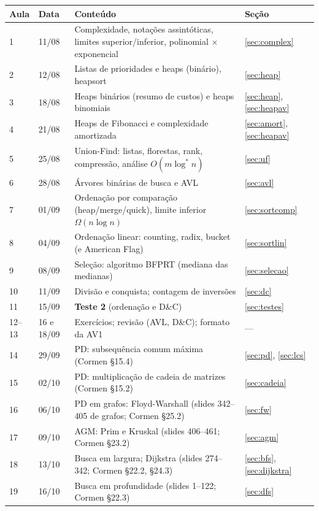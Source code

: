 \documentclass[11pt,a4paper]{article}
\newcommand{\lgs}{\log^{*}}
\theoremstyle{plain}
\theoremstyle{definition}
\theoremstyle{remark}
\numberwithin{equation}{section}
\begin{document}
\begin{center}
\small
\begin{tabularx}{\linewidth}{@{}llX l@{}}
\toprule
\textbf{Aula} & \textbf{Data} & \textbf{Conteúdo} & \textbf{Seção}\\
\midrule
1 & 11/08 & Complexidade, notações assintóticas, limites superior/inferior, polinomial $\times$ exponencial & \ref{sec:complex}\\
2 & 12/08 & Listas de prioridades e heaps (binário), heapsort & \ref{sec:heap}\\
3 & 18/08 & Heaps binários (resumo de custos) e heaps binomiais & \ref{sec:heap}, \ref{sec:heapav}\\
4 & 21/08 & Heaps de Fibonacci e complexidade amortizada & \ref{sec:amort}, \ref{sec:heapav}\\
5 & 25/08 & Union-Find: listas, florestas, rank, compressão, análise $O(m\lgs n)$ & \ref{sec:uf}\\
6 & 28/08 & Árvores binárias de busca e AVL & \ref{sec:avl}\\
7 & 01/09 & Ordenação por comparação (heap/merge/quick), limite inferior $\Omega(n\log n)$ & \ref{sec:sortcomp}\\
8 & 04/09 & Ordenação linear: counting, radix, bucket (e American Flag) & \ref{sec:sortlin}\\
9 & 08/09 & Seleção: algoritmo BFPRT (mediana das medianas) & \ref{sec:selecao}\\
10 & 11/09 & Divisão e conquista; contagem de inversões & \ref{sec:dc}\\
11 & 15/09 & \textbf{Teste 2} (ordenação e D\&C) & \ref{sec:testes}\\
12--13 & 16 e 18/09 & Exercícios; revisão (AVL, D\&C); formato da AV1 & ---\\
\midrule
14 & 29/09 & PD: subsequência comum máxima (Cormen §15.4) & \ref{sec:pd}, \ref{sec:lcs}\\
15 & 02/10 & PD: multiplicação de cadeia de matrizes (Cormen §15.2) & \ref{sec:cadeia}\\
16 & 06/10 & PD em grafos: Floyd-Warshall (slides 342--405 de grafos; Cormen §25.2) & \ref{sec:fw}\\
17 & 09/10 & AGM: Prim e Kruskal (slides 406--461; Cormen §23.2) & \ref{sec:agm}\\
18 & 13/10 & Busca em largura; Dijkstra (slides 274--342; Cormen §22.2, §24.3) & \ref{sec:bfs}, \ref{sec:dijkstra}\\
19 & 16/10 & Busca em profundidade (slides 1--122; Cormen §22.3) & \ref{sec:dfs}\\

\end{tabularx}
\end{center}
\end{document}
